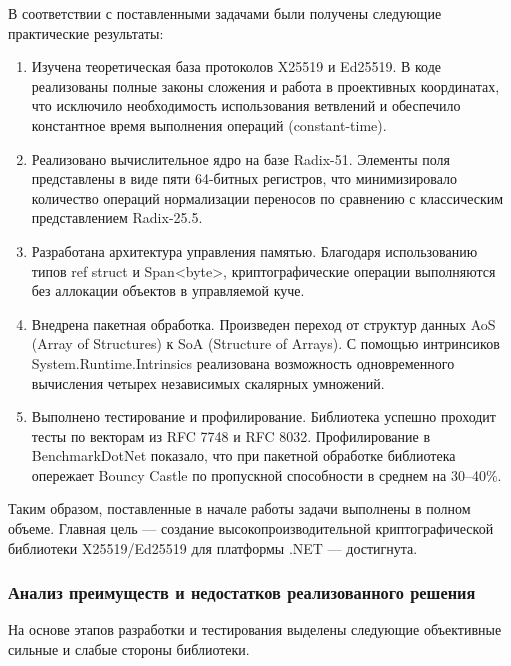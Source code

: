 В соответствии с поставленными задачами были получены следующие практические результаты:
\begin{enumerate}
    \item Изучена теоретическая база протоколов X25519 и Ed25519. В коде реализованы полные законы сложения и работа в проективных координатах, что исключило необходимость использования ветвлений и обеспечило константное время выполнения операций (constant-time).
    
    \item Реализовано вычислительное ядро на базе Radix-51. Элементы поля представлены в виде пяти 64-битных регистров, что минимизировало количество операций нормализации переносов по сравнению с классическим представлением Radix-25.5.
    
    \item Разработана архитектура управления памятью. Благодаря использованию типов ref struct и Span<byte>, криптографические операции выполняются без аллокации объектов в управляемой куче.
    
    \item Внедрена пакетная обработка. Произведен переход от структур данных AoS (Array of Structures) к SoA (Structure of Arrays). С помощью интринсиков System.Runtime.Intrinsics реализована возможность одновременного вычисления четырех независимых скалярных умножений.
    
    \item Выполнено тестирование и профилирование. Библиотека успешно проходит тесты по векторам из RFC 7748 и RFC 8032. Профилирование в BenchmarkDotNet показало, что при пакетной обработке библиотека опережает Bouncy Castle по пропускной способности в среднем на 30–40\%.
\end{enumerate}

Таким образом, поставленные в начале работы задачи выполнены в полном объеме. Главная цель — создание высокопроизводительной криптографической библиотеки X25519/Ed25519 для платформы .NET — достигнута.

\subsubsection{Анализ преимуществ и недостатков реализованного решения}

На основе этапов разработки и тестирования выделены следующие объективные сильные и слабые стороны библиотеки.

